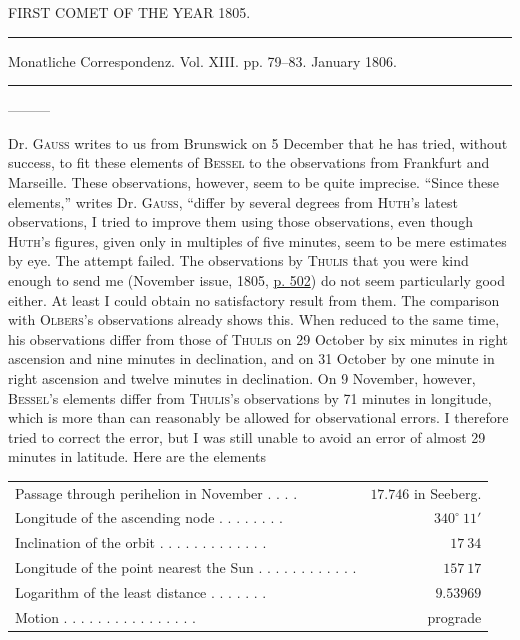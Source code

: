 \begin{center}
FIRST COMET OF THE YEAR 1805.

\rule{0.6\linewidth}{0.4pt}

Monatliche Correspondenz. Vol. XIII. pp. 79–83. January 1806.

\rule{0.6\linewidth}{0.4pt}

—\quad—\quad—
\end{center}

Dr. \textsc{Gauss} writes to us from Brunswick on 5 December that he has tried, without success, to fit these elements of \textsc{Bessel} to the observations from Frankfurt and Marseille. These observations, however, seem to be quite imprecise. “Since these elements,” writes Dr. \textsc{Gauss}, “differ by several degrees from \textsc{Huth}’s latest observations, I tried to improve them using those observations, even though \textsc{Huth}’s figures, given only in multiples of five minutes, seem to be mere estimates by eye. The attempt failed. The observations by \textsc{Thulis} that you were kind enough to send me (November issue, 1805, \href{https://www.digitale-sammlungen.de/en/view/bsb10538604?page=518}{p. 502}) do not seem particularly good either. At least I could obtain no satisfactory result from them. The comparison with \textsc{Olbers}’s observations already shows this. When reduced to the same time, his observations differ from those of \textsc{Thulis} on 29 October by six minutes in right ascension and nine minutes in declination, and on 31 October by one minute in right ascension and twelve minutes in declination. On 9 November, however, \textsc{Bessel}’s elements differ from \textsc{Thulis}’s observations by 71 minutes in longitude, which is more than can reasonably be allowed for observational errors. I therefore tried to correct the error, but I was still unable to avoid an error of almost 29 minutes in latitude. Here are the elements

\begin{center}
\begingroup\fontsize{8}{10}\selectfont\setlength{\tabcolsep}{3pt}\renewcommand{\arraystretch}{1.1}
\begin{tabular}{lr}
Passage through perihelion in November . . . . & $17.746$ in Seeberg. \\
Longitude of the ascending node . . . . . . . . & $340^\circ\ 11'$ \\
Inclination of the orbit . . . . . . . . . . . . . & $17\ 34$ \\
Longitude of the point nearest the Sun . . . . . . . . . . . . & $157\ 17$ \\
Logarithm of the least distance . . . . . . . & $9.53969$ \\
Motion . . . . . . . . . . . . . . . . & prograde \\
\end{tabular}\endgroup
\end{center}

